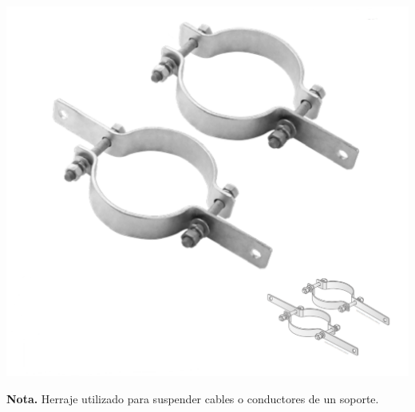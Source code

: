 \noindent %
\begin{minipage}[t]{0.48\textwidth} %
    \centering
    \includegraphics[width=\linewidth]{fotosherrajes/abrazadera de suspension.png}
    \footnotesize
    \raggedright
    \textbf{Nota.} Herraje utilizado para suspender cables o conductores de un soporte.
\end{minipage}%
\hfill%
